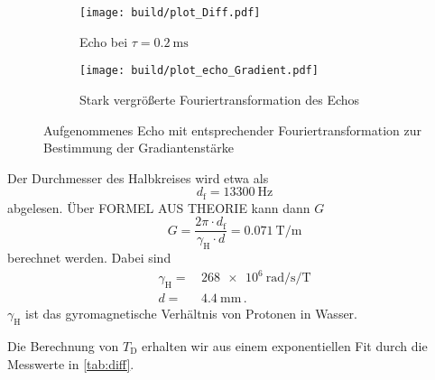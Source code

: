 \begin{figure}
    \centering
    \begin{subfigure}{0.4\textwidth}
        \centering
        \texttt{[image: build/plot\_Diff.pdf]}
        \caption{Echo bei $\tau = \SI{0.2}{\milli\second}$}
        \label{fig:echo}
    \end{subfigure}
    \begin{subfigure}{0.4\textwidth}
        \centering
        \texttt{[image: build/plot\_echo\_Gradient.pdf]}
        \caption{Stark vergrößerte Fouriertransformation des Echos}
        \label{fig:fourier}
    \end{subfigure}
    \caption{Aufgenommenes Echo mit entsprechender Fouriertransformation zur Bestimmung der Gradiantenstärke}
    \label{fig:g_messung}
\end{figure}

Der Durchmesser des Halbkreises wird etwa als 
\begin{equation}
    d_\text{f} = \SI{13300}{\hertz} 
    \label{eq:df}
\end{equation}
abgelesen.
Über FORMEL AUS THEORIE kann dann $G$ 
\begin{equation}
    G = \frac{2 \pi \cdot d_\text{f}}{\gamma _\text{H} \cdot d} = \SI{0.071}{\tesla\per\meter}
    \label{eq:g_wert}
\end{equation}
berechnet werden.
Dabei sind
\begin{align*}
    \gamma _\text{H} =& \, \SI{268e6}{\radian\per\second\per\tesla} \\
    d =& \, \SI{4.4}{\milli\meter} \, . 
\end{align*}
$\gamma _\text{H}$ ist das gyromagnetische Verhältnis von Protonen in Wasser. \cite{physics_constants}

Die Berechnung von $T_\text{D}$ erhalten wir aus einem exponentiellen Fit durch die Messwerte in \autoref{tab:diff}.

